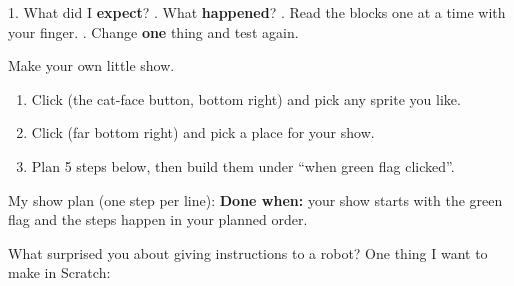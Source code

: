\begin{tip}
1. What did I \textbf{expect}? . What \textbf{happened}? . Read the blocks one at a time with your finger. . Change \textbf{one} thing and test again.
\end{tip}

\begin{exercise}
Make your own little show.
\begin{enumerate}[leftmargin=1.4em,itemsep=1pt]
  \item Click  (the cat-face button, bottom right) and pick any sprite you like.
  \item Click  (far bottom right) and pick a place for your show.
  \item Plan 5 steps below, then build them under \enquote{when green flag clicked}.
\end{enumerate}
My show plan (one step per line):
\textbf{Done when:} your show starts with the green flag and the steps happen in your planned order.
\end{exercise}

\begin{vocab}
\end{vocab}

\begin{reflection}
What surprised you about giving instructions to a robot?
One thing I want to make in Scratch:
\end{reflection}

